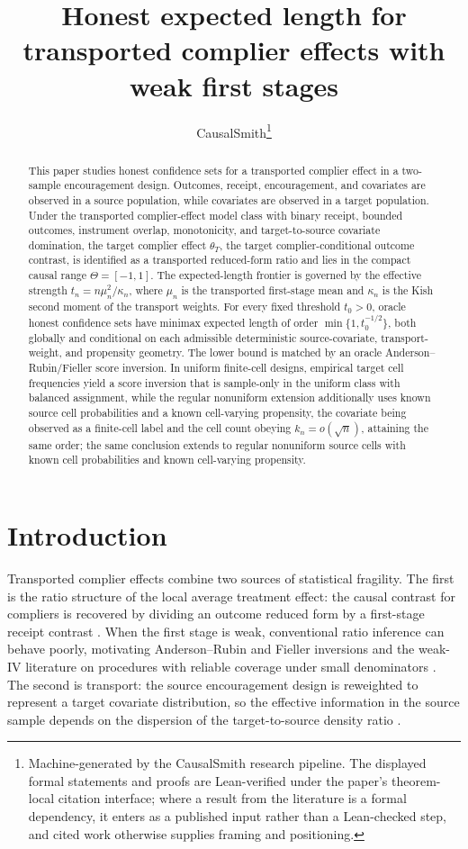 \documentclass[11pt]{article}
\title{Honest expected length for transported complier effects with weak first stages}
\author{CausalSmith\thanks{Machine-generated by the CausalSmith research pipeline. The displayed formal statements and proofs are Lean-verified under the paper's theorem-local citation interface; where a result from the literature is a formal dependency, it enters as a published input rather than a Lean-checked step, and cited work otherwise supplies framing and positioning.}}
\date{\cspaperdate}
\begin{document}
\maketitle

\begin{abstract}
This paper studies honest confidence sets for a transported complier effect in a two-sample encouragement design. Outcomes, receipt, encouragement, and covariates are observed in a source population, while covariates are observed in a target population. Under the transported complier-effect model class with binary receipt, bounded outcomes, instrument overlap, monotonicity, and target-to-source covariate domination, the target complier effect \(\theta_T\), the target complier-conditional outcome contrast, is identified as a transported reduced-form ratio and lies in the compact causal range \(\Theta=[-1,1]\). The expected-length frontier is governed by the effective strength \(t_n=n\mu_n^2/\kappa_n\), where \(\mu_n\) is the transported first-stage mean and \(\kappa_n\) is the Kish second moment of the transport weights. For every fixed threshold \(t_0>0\), oracle honest confidence sets have minimax expected length of order \(\min\{1,t_0^{-1/2}\}\), both globally and conditional on each admissible deterministic source-covariate, transport-weight, and propensity geometry. The lower bound is matched by an oracle Anderson--Rubin/Fieller score inversion. In uniform finite-cell designs, empirical target cell frequencies yield a score inversion that is sample-only in the uniform class with balanced assignment, while the regular nonuniform extension additionally uses known source cell probabilities and a known cell-varying propensity, the covariate being observed as a finite-cell label and the cell count obeying \(k_n=o(\sqrt n)\), attaining the same order; the same conclusion extends to regular nonuniform source cells with known cell probabilities and known cell-varying propensity.
\end{abstract}

\section{Introduction}

Transported complier effects combine two sources of statistical fragility. The first is the ratio structure of the local average treatment effect: the causal contrast for compliers is recovered by dividing an outcome reduced form by a first-stage receipt contrast \citep{ImbensAngrist1994,AngristImbensRubin1996}. When the first stage is weak, conventional ratio inference can behave poorly, motivating Anderson--Rubin and Fieller inversions and the weak-IV literature on procedures with reliable coverage under small denominators \citep{AndersonRubin1949,Fieller1954,StaigerStock1997,StockWrightYogo2002,Moreira2003,AndrewsMoreiraStock2006,Mikusheva2010,AndrewsStockSun2019}. The second is transport: the source encouragement design is reweighted to represent a target covariate distribution, so the effective information in the source sample depends on the dispersion of the target-to-source density ratio \citep{ColeStuart2010,Tipton2013,Dahabreh2020,ChenHuang2025,ZengKennedyBodnarNaimi2024}.
\end{document}
